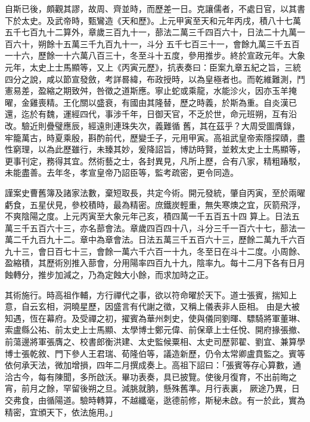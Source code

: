 \begin{pinyinscope}
 自斯已後，頗觀其謬，故周、齊並時，而歷差一日。克讓儒者，不處日官，以其書下於太史。及武帝時，甄鸞造《天和歷》。上元甲寅至天和元年丙戌，積八十七萬五千七百九十二算外，章歲三百九十一，蔀法二萬三千四百六十，日法二十九萬一百六十，朔餘十五萬三千九百九十一，斗分
 五千七百三十一，會餘九萬三千五百一十六，歷餘一十六萬八百三十，冬至斗十五度，參用推步。終於宣政元年。大象元年，太史上士馬顯等，又上《丙寅元歷》，抗表奏曰：臣案九章五紀之旨，三統四分之說，咸以節宣發斂，考詳晷緯，布政授時，以為皇極者也。而乾維難測，鬥憲易差，盈縮之期致舛，咎徵之道斯應。寧止蛇或乘龍，水能沴火，因亦玉羊掩曜，金雞喪精。王化關以盛衰，有國由其隆替，歷之時義，於斯為重。自炎漢已還，迄於有魏，運經四代，事涉千年，日御天官，不乏於世，命元班朔，互有沿改。驗近則疊璧應辰，經遠則連珠失次，義難循
 舊，其在茲乎？大周受圖膺錄，牢籠萬古，時夏乘殷，斟酌前代，歷變壬子，元用甲寅。高祖武皇帝索隱探賾，盡性窮理，以為此歷雖行，未臻其妙，爰降詔旨，博訪時賢，並敕太史上士馬顯等，更事刊定，務得其宜。然術藝之士，各封異見，凡所上歷，合有八家，精粗踳駁，未能盡善。去年冬，孝宣皇帝乃詔臣等，監考疏密，更令同造。



 謹案史曹舊簿及諸家法數，棄短取長，共定今術。開元發統，肇自丙寅，至於兩曜虧食，五星伏見，參校積時，最為精密。庶鐵炭輕重，無失寒燠之宜，灰箭飛浮，不爽陰陽之度。上元丙寅至大象元年己亥，積四萬一千五百五十四
 算上。日法五萬三千五百六十三，亦名蔀會法。章歲四百四十八，斗分三千一百六十七，蔀法一萬二千九百九十二。章中為章會法。日法五萬三千五百六十三，歷餘二萬九千六百九十三，會日百七十三，會餘一萬六千六百一十九，冬至日在斗十二度。小周餘、盈縮積，其歷術別推入蔀會，分用陽率四百九十九，陰率九。每十二月下各有日月蝕轉分，推步加減之，乃為定蝕大小餘，而求加時之正。



 其術施行。時高祖作輔，方行禪代之事，欲以符命曜於天下。道士張賓，揣知上意，自云玄相，洞曉星歷，因盛言有代謝之徵，又稱上儀表非人臣相。
 由是大被知遇，恆在幕府。及受禪之初，擢賓為華州刺史，使與儀同劉暉、驃騎將軍董琳、索盧縣公祐、前太史上士馬顯、太學博士鄭元偉、前保章上士任悅、開府掾張撤、前蕩邊將軍張膺之、校書郎衡洪建、太史監候粟相、太史司歷郭翟、劉宜、兼算學博士張乾敘、門下參人王君瑞、荀隆伯等，議造新歷，仍令太常卿盧賁監之。賓等依何承天法，微加增損，四年二月撰成奏上。高祖下詔曰：「張賓等存心算數，通洽古今，每有陳聞，多所啟沃。畢功表奏，具已披覽。使後月復育，不出前晦之宵，前月之餘，罕留後朔之旦。減朓就朒，懸殊舊準。月行表裏，
 厥途乃異，日交弗食，由循陽道。驗時轉算，不越纖毫，逖德前修，斯秘未啟。有一於此，實為精密，宜頒天下，依法施用。」




\end{pinyinscope}

